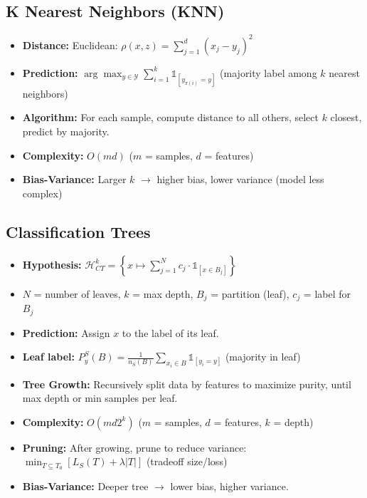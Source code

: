 \subsection{K Nearest Neighbors (KNN)}
\begin{itemize}
    \item \textbf{Distance:} Euclidean: $\rho(x, z) = \sum_{j=1}^d (x_j - y_j)^2$
    \item \textbf{Prediction:} $\arg\max_{y \in \mathcal{Y}} \sum_{i=1}^k \mathds{1}_{[y_{\pi(i)} = y]}$ (majority label among $k$ nearest neighbors)
    \item \textbf{Algorithm:} For each sample, compute distance to all others, select $k$ closest, predict by majority.
    \item \textbf{Complexity:} $O(md)$ ($m$ = samples, $d$ = features)
    \item \textbf{Bias-Variance:} Larger $k$ $\rightarrow$ higher bias, lower variance (model less complex)
\end{itemize}

\subsection{Classification Trees}
\begin{itemize}
    \item \textbf{Hypothesis:} $\mathcal{H}_{CT}^k = \left\{ x \mapsto \sum_{j=1}^N c_j \cdot \mathds{1}_{[x \in B_j]} \right\}$
    \item $N$ = number of leaves, $k$ = max depth, $B_j$ = partition (leaf), $c_j$ = label for $B_j$
    \item \textbf{Prediction:} Assign $x$ to the label of its leaf.
    \item \textbf{Leaf label:} $P_y^S(B) = \frac{1}{n_S(B)} \sum_{x_i \in B} \mathds{1}_{[y_i = y]}$ (majority in leaf)
    \item \textbf{Tree Growth:} Recursively split data by features to maximize purity, until max depth or min samples per leaf.
    \item \textbf{Complexity:} $O(m d 2^k)$ ($m$ = samples, $d$ = features, $k$ = depth)
    \item \textbf{Pruning:} After growing, prune to reduce variance: $\min_{T \subseteq T_0} [L_S(T) + \lambda |T|]$ (tradeoff size/loss)
    \item \textbf{Bias-Variance:} Deeper tree $\rightarrow$ lower bias, higher variance.
\end{itemize}